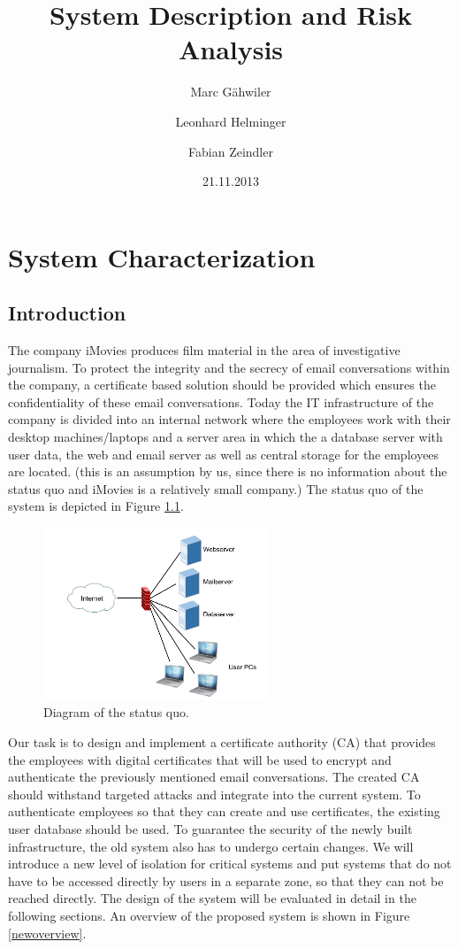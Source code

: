 \documentclass[a4paper, toc=index, 12pt, DIV14, twoside, BCOR2cm, headsepline, numbers=noenddot, bibliography=totoc]{scrbook}
\title{\huge\sffamily\bfseries System Description and Risk Analysis}
\author{Marc G\"ahwiler \and Leonhard Helminger \and Fabian Zeindler}
\date{21.11.2013}
\begin{document}
\maketitle

\tableofcontents
\pagebreak


\chapter{System Characterization}
\section{Introduction}
The company iMovies produces film material in the area of investigative journalism. To protect the integrity and the secrecy of email conversations within the company, a certificate based solution should be provided which ensures the confidentiality of these email conversations.\newline
Today the IT infrastructure of the company is divided into an internal network where the employees work with their desktop machines/laptops and a server area in which the a database server with user data, the web and email server as well as central storage for the employees are located. (this is an assumption by us, since there is no information about the status quo and iMovies is a relatively small company.) The status quo of the system is depicted in Figure \ref{oldsystem}.

\begin{figure}[H]
  \centering
    \includegraphics[width=0.6\textwidth]{images/old_system.pdf}  
  \caption{Diagram of the status quo.}
  \label{oldsystem}
\end{figure}

Our task is to design and implement a certificate authority (CA) that provides the employees with digital certificates that will be used to encrypt and authenticate the previously mentioned email conversations.\newline
The created CA should withstand targeted attacks and integrate into the current system. To authenticate employees so that they can create and use certificates, the existing user database should be used. To guarantee the security of the newly built infrastructure, the old system also has to undergo certain changes. We will introduce a new level of isolation for critical systems and put systems that do not have to be accessed directly by users in a separate zone, so that they can not be reached directly. The design of the system will be evaluated in detail in the following sections. An overview of the proposed system is shown in Figure \ref{newoverview}.
\end{document}
